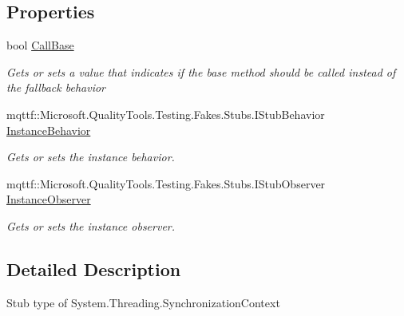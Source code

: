 \subsection*{Properties}
\begin{DoxyCompactItemize}
\item 
bool \hyperlink{class_system_1_1_threading_1_1_fakes_1_1_stub_synchronization_context_a6769e1a3903ef762c5bd6473ec2e040c}{Call\-Base}
\begin{DoxyCompactList}\small\item\em Gets or sets a value that indicates if the base method should be called instead of the fallback behavior\end{DoxyCompactList}\item 
mqttf\-::\-Microsoft.\-Quality\-Tools.\-Testing.\-Fakes.\-Stubs.\-I\-Stub\-Behavior \hyperlink{class_system_1_1_threading_1_1_fakes_1_1_stub_synchronization_context_a6e1e0620ee748d16c4fbbf8a1d49deac}{Instance\-Behavior}
\begin{DoxyCompactList}\small\item\em Gets or sets the instance behavior.\end{DoxyCompactList}\item 
mqttf\-::\-Microsoft.\-Quality\-Tools.\-Testing.\-Fakes.\-Stubs.\-I\-Stub\-Observer \hyperlink{class_system_1_1_threading_1_1_fakes_1_1_stub_synchronization_context_adad410beea0464c94b2dc8a70beb41da}{Instance\-Observer}
\begin{DoxyCompactList}\small\item\em Gets or sets the instance observer.\end{DoxyCompactList}\end{DoxyCompactItemize}


\subsection{Detailed Description}
Stub type of System.\-Threading.\-Synchronization\-Context



